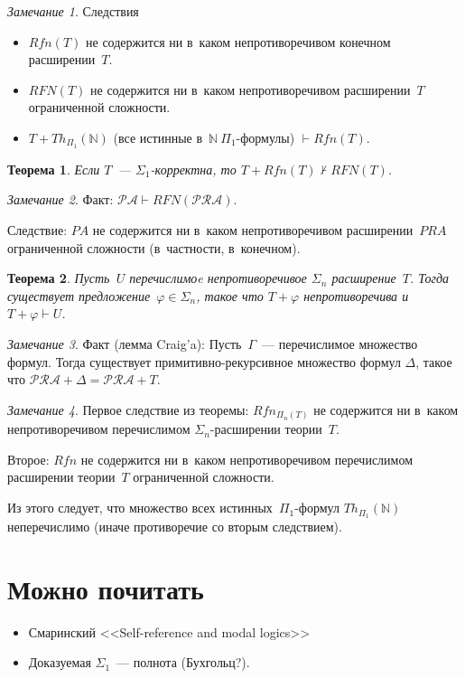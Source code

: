 \documentclass{article}
\newtheorem{theorem}{Теорема}
\theoremstyle{remark}
\newtheorem*{remark}{Замечание}
\renewcommand{\phi}{\varphi}
\begin{document}
\begin{remark}
  Следствия
  \begin{itemize}
    \item $Rfn(T)$ не содержится ни в~каком непротиворечивом конечном
      расширении~$T$.
    \item $RFN(T)$ не содержится ни в~каком непротиворечивом расширении~$T$
      ограниченной сложности.
    \item $T + Th_{\Pi_1}(\mathbb{N})$ (все истинные в~$\mathbb{N}\
      \Pi_1$-формулы) $\vdash Rfn(T)$.
  \end{itemize}
\end{remark}

\begin{theorem}
  Если $T$~--- $\Sigma_1$-корректна, то $T + Rfn(T) \not\vdash RFN(T)$.
\end{theorem}

\begin{remark}
  Факт: $\mathcal{PA} \vdash RFN(\mathcal{PRA})$.

  Следствие: $PA$ не содержится ни в~каком непротиворечивом расширении~$PRA$
  ограниченной сложности (в~частности, в~конечном).
\end{remark}

\begin{theorem}
  Пусть~$U$ перечислимоe непротиворечивое $\Sigma_n$ расширение~$T$. Тогда
  существует предложение~$\phi \in \Sigma_n$, такое что $T + \phi$
  непротиворечива и~$T + \phi \vdash U$.
\end{theorem}
\begin{remark}
  Факт (лемма Craig'a): Пусть~$\Gamma$~--- перечислимое множество формул. Тогда
  существует примитивно-рекурсивное множество формул $\Delta$, такое что
  $\mathcal{PRA} + \Delta = \mathcal{PRA} + T$.
\end{remark}

\begin{remark}
  Первое следствие из теоремы: $Rfn_{\Pi_n(T)}$ не содержится ни в~каком
  непротиворечивом перечислимом $\Sigma_n$-расширении теории~$T$.

  Второе: $Rfn$ не содержится ни в~каком
  непротиворечивом перечислимом расширении теории~$T$ ограниченной сложности.

  Из этого следует, что множество всех истинных~$\Pi_1$-формул
  $Th_{\Pi_1}(\mathbb{N})$ неперечислимо (иначе противоречие со вторым
  следствием).
\end{remark}

\section*{Можно почитать}

\begin{itemize}
  \item Смаринский <<Self-reference and modal logics>>
  \item Доказуемая $\Sigma_1$~--- полнота (Бухгольц?).
\end{itemize}
\end{document}
